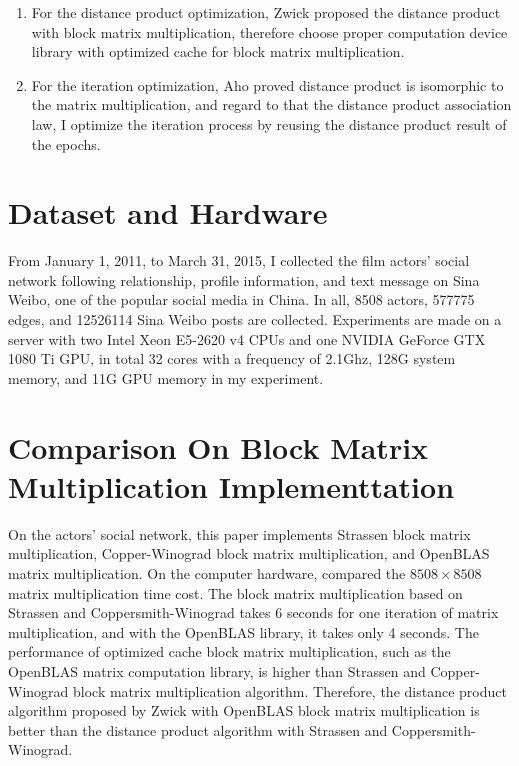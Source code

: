 \documentclass[review]{cvpr}
\begin{document}
\begin{enumerate}
\item For the distance product optimization, Zwick proposed the distance product with block matrix multiplication, therefore choose proper computation device library with optimized cache for block matrix multiplication.
\item For the iteration optimization, Aho proved distance product is isomorphic to the matrix multiplication, and regard to that the distance product association law, I optimize the iteration process by reusing the distance product result of the epochs.
\end{enumerate}


\section{Dataset and Hardware}

From January 1, 2011, to March 31, 2015, I collected the film actors' social network following relationship, profile information, and text message on Sina Weibo, one of the popular social media in China.
In all, 8508 actors, 577775 edges, and 12526114 Sina Weibo posts are collected.
Experiments are made on a server with two Intel Xeon E5-2620 v4 CPUs and one NVIDIA GeForce GTX 1080 Ti GPU, in total 32 cores with a frequency of 2.1Ghz, 128G system memory, and 11G GPU memory in my experiment.



\section{Comparison On Block Matrix Multiplication Implementtation}

On the actors' social network, this paper implements Strassen block matrix multiplication, Copper-Winograd block matrix multiplication, and OpenBLAS matrix multiplication.
On the computer hardware, compared the $8508\times 8508$ matrix multiplication time cost.
The block matrix multiplication based on Strassen and Coppersmith-Winograd takes 6 seconds for one iteration of matrix multiplication, and with the OpenBLAS library, it takes only 4 seconds.
The performance of optimized cache block matrix multiplication, such as the OpenBLAS matrix computation library, is higher than Strassen and Copper-Winograd block matrix multiplication algorithm.
Therefore, the distance product algorithm proposed by Zwick with OpenBLAS block matrix multiplication is better than the distance product algorithm with Strassen and Coppersmith-Winograd.
\end{document}
